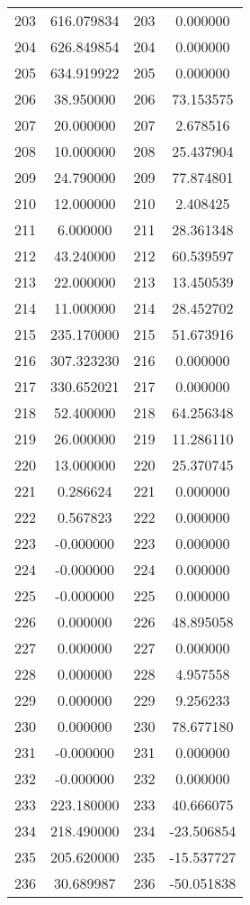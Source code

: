 \documentclass[12pt]{article}
\begin{document}
\begin{longtable}{@{}cccc@{}}
203 & 616.079834 & 203 & 0.000000 \\
204 & 626.849854 & 204 & 0.000000 \\
205 & 634.919922 & 205 & 0.000000 \\
206 & 38.950000 & 206 & 73.153575 \\
207 & 20.000000 & 207 & 2.678516 \\
208 & 10.000000 & 208 & 25.437904 \\
209 & 24.790000 & 209 & 77.874801 \\
210 & 12.000000 & 210 & 2.408425 \\
211 & 6.000000 & 211 & 28.361348 \\
212 & 43.240000 & 212 & 60.539597 \\
213 & 22.000000 & 213 & 13.450539 \\
214 & 11.000000 & 214 & 28.452702 \\
215 & 235.170000 & 215 & 51.673916 \\
216 & 307.323230 & 216 & 0.000000 \\
217 & 330.652021 & 217 & 0.000000 \\
218 & 52.400000 & 218 & 64.256348 \\
219 & 26.000000 & 219 & 11.286110 \\
220 & 13.000000 & 220 & 25.370745 \\
221 & 0.286624 & 221 & 0.000000 \\
222 & 0.567823 & 222 & 0.000000 \\
223 & -0.000000 & 223 & 0.000000 \\
224 & -0.000000 & 224 & 0.000000 \\
225 & -0.000000 & 225 & 0.000000 \\
226 & 0.000000 & 226 & 48.895058 \\
227 & 0.000000 & 227 & 0.000000 \\
228 & 0.000000 & 228 & 4.957558 \\
229 & 0.000000 & 229 & 9.256233 \\
230 & 0.000000 & 230 & 78.677180 \\
231 & -0.000000 & 231 & 0.000000 \\
232 & -0.000000 & 232 & 0.000000 \\
233 & 223.180000 & 233 & 40.666075 \\
234 & 218.490000 & 234 & -23.506854 \\
235 & 205.620000 & 235 & -15.537727 \\
236 & 30.689987 & 236 & -50.051838 \\

\end{longtable}
\end{document}
